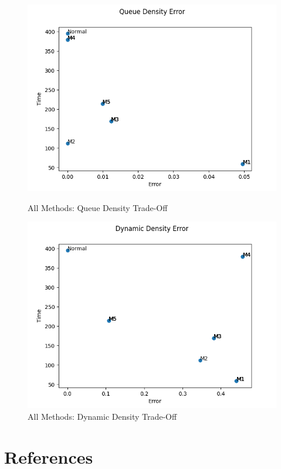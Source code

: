 \documentclass[paper=a4, fontsize = 12pt]{scrartcl}
\numberwithin{equation}{section}		%
\numberwithin{figure}{section}			%
\numberwithin{table}{section}				%
\begin{document}
\begin{figure}[H]
    \centering
    \captionsetup{justification=centering,margin=2cm}
    \includegraphics[width = 15cm]{tradeoff_queue.png}
    \caption{All Methods: Queue Density Trade-Off}
    \label{fig:AllMQueueTradeOff}
    
    \includegraphics[width = 15cm]{tradeoff_dynamic.png}
    \caption{All Methods: Dynamic Density Trade-Off}
    \label{fig:AllMDynamicTradeOff}
\end{figure}

\section{References}
\end{document}
